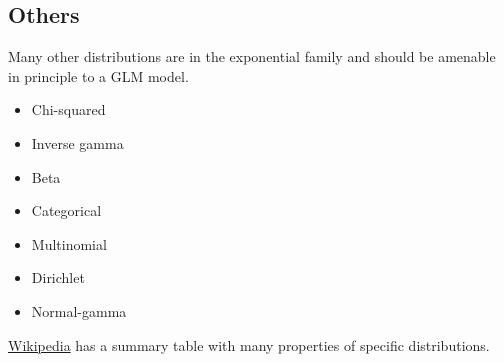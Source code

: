 \documentclass{article}
\begin{document}
\subsection{Others}
Many other distributions are in the exponential family and should be amenable in
principle to a GLM model.
\begin{itemize}
\item Chi-squared
\item Inverse gamma
\item Beta
\item Categorical
\item Multinomial
\item Dirichlet
\item Normal-gamma
\end{itemize}

\href{https://en.wikipedia.org/wiki/Exponential_family#Table_of_distributions}{Wikipedia}
has a summary table with many properties of specific distributions.
\end{document}
